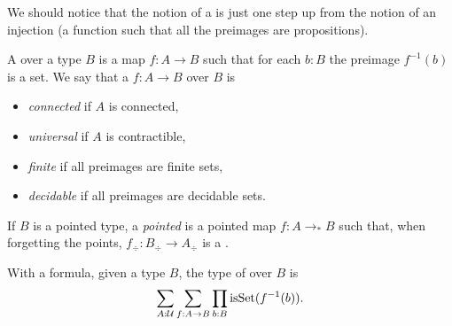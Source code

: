 We should notice that the notion of a \covering is just one step up from the notion of an injection (a function such that all the preimages are propositions).

\begin{definition}\label{def:covering}
A \emph{\covering} over a type $B$ 
is a map $f:A\to B$ such that for each $b:B$ the preimage $f^{-1}(b)$ is a set.
We say that a \covering $f:A\to B$ over $B$ is
\begin{itemize}
\item \emph{connected} if $A$ is connected, 
\item \emph{universal} if $A$ is contractible, 
\item \emph{finite} if all preimages are finite sets,
\item \emph{decidable} if all preimages are decidable sets.
\end{itemize}
If $B$ is a pointed type, a \emph{pointed} \covering is a pointed map $f:A\to_*B$ such that, when forgetting the points, $f_\div:B_\div\to A_\div$ is a \covering.
\end{definition}
With a formula, given a type $B$, the type of \coverings over $B$ is
\[
\sum_{A:\mathcal{U}}\sum_{f:A\to B}\prod_{b:B}\mathrm{isSet}(f^{-1}(b)).
\]

